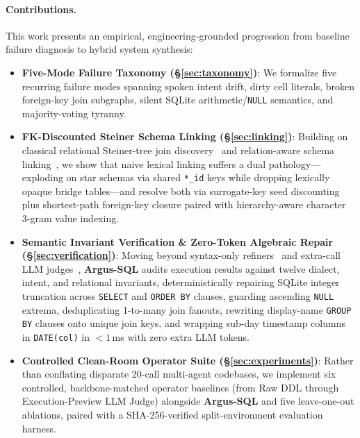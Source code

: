 \documentclass[10pt,twocolumn]{article}
\begin{document}
\paragraph{Contributions.} This work presents an empirical, engineering-grounded progression from baseline failure diagnosis to hybrid system synthesis:
\begin{itemize}
  \item \textbf{Five-Mode Failure Taxonomy (\S\ref{sec:taxonomy})}: We formalize five recurring failure modes spanning spoken intent drift, dirty cell literals, broken foreign-key join subgraphs, silent SQLite arithmetic/\texttt{NULL} semantics, and majority-voting tyranny.
  \item \textbf{FK-Discounted Steiner Schema Linking (\S\ref{sec:linking})}: Building on classical relational Steiner-tree join discovery~\cite{bhalotia2002banks,hristidis2002discover} and relation-aware schema linking~\cite{wang2020ratsql,li2023resdsql}, we show that naive lexical linking suffers a dual pathology—exploding on star schemas via shared \texttt{*\_id} keys while dropping lexically opaque bridge tables—and resolve both via surrogate-key seed discounting plus shortest-path foreign-key closure paired with hierarchy-aware character 3-gram value indexing.
  \item \textbf{Semantic Invariant Verification \& Zero-Token Algebraic Repair (\S\ref{sec:verification})}: Moving beyond syntax-only refiners~\cite{wang2025macsql,chen2023teaching} and extra-call LLM judges~\cite{lee2025mcssql,talaei2024chess}, \textbf{Argus-SQL} audits execution results against twelve dialect, intent, and relational invariants, deterministically repairing SQLite integer truncation across \texttt{SELECT} and \texttt{ORDER BY} clauses, guarding ascending \texttt{NULL} extrema, deduplicating 1-to-many join fanouts, rewriting display-name \texttt{GROUP BY} clauses onto unique join keys, and wrapping sub-day timestamp columns in \texttt{DATE(col)} in $<1$\,ms with zero extra LLM tokens.
  \item \textbf{Controlled Clean-Room Operator Suite (\S\ref{sec:experiments})}: Rather than conflating disparate 20-call multi-agent codebases, we implement six controlled, backbone-matched operator baselines (from Raw DDL through Execution-Preview LLM Judge) alongside \textbf{Argus-SQL} and five leave-one-out ablations, paired with a SHA-256-verified split-environment evaluation harness.
\end{itemize}
\end{document}
